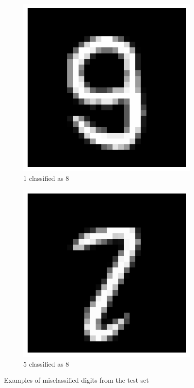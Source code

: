 \documentclass{article}
\begin{document}
\begin{figure}[H]
    \begin{subfigure}[b]{0.3\textwidth}
        \centering
        \includegraphics[width=\textwidth]{digit4.png}
        \caption{1 classified as 8}
        \label{fig:digit4}
    \end{subfigure}
    \hfill
    \begin{subfigure}[b]{0.3\textwidth}
        \centering
        \includegraphics[width=\textwidth]{digit5.png}
        \caption{5 classified as 8}
        \label{fig:digit5}
    \end{subfigure}

    \caption{Examples of misclassified digits from the test set}
    \label{fig:misclassified}
\end{figure}
\end{document}
